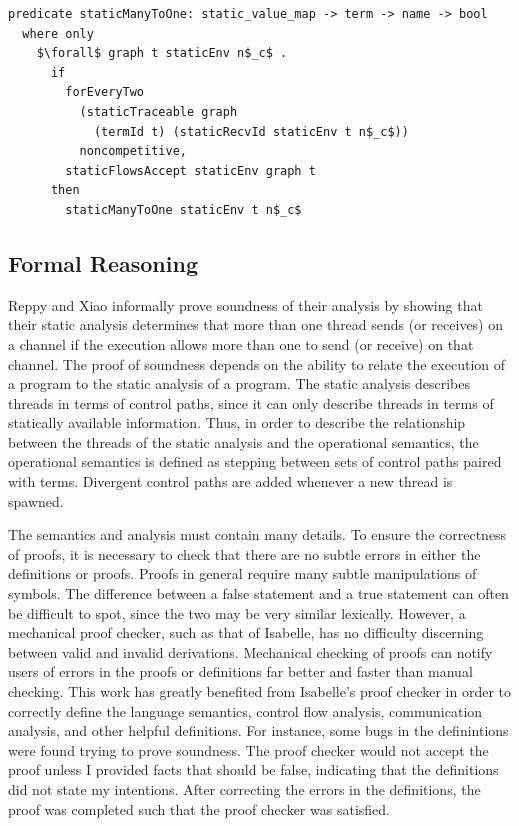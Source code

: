 \documentclass[letterpaper, 11pt]{extarticle}
\begin{document}
\begin{lstlisting}[language=logic, mathescape]
  predicate staticManyToOne: static_value_map -> term -> name -> bool
  where only
    $\forall$ graph t staticEnv n$_c$ .
      if
        forEveryTwo
          (staticTraceable graph
            (termId t) (staticRecvId staticEnv t n$_c$))
          noncompetitive,
        staticFlowsAccept staticEnv graph t 
      then
        staticManyToOne staticEnv t n$_c$
\end{lstlisting}

\subsection{Formal Reasoning}

Reppy and Xiao informally prove soundness of their analysis by showing that their static analysis
determines that more than one thread sends (or receives) on a channel if the execution allows more
than one to send (or receive) on that channel. The proof of soundness depends on the
ability to relate the execution of a program to the static analysis of a program. The static
analysis describes threads in terms of control paths, since it can only describe threads in
terms of statically available information. Thus, in order to describe the relationship between
the threads of the static analysis and the operational semantics, the operational semantics is
defined as stepping between sets of control paths paired with terms. Divergent control paths
are added whenever a new thread is spawned.

The semantics and analysis must contain many details. To ensure the
correctness of proofs, it is necessary to check that there are no subtle errors in either the 
definitions or proofs. Proofs in general require many subtle manipulations of symbols. The
difference between a false statement and a true statement can often be difficult to spot, since
the two may be very similar lexically. However, a mechanical proof checker, such as that of 
Isabelle, has no difficulty discerning between valid and invalid derivations.
Mechanical checking of proofs can notify users of errors in the proofs or definitions far better
and faster than manual checking. This work has greatly benefited from Isabelle's proof checker in
order to correctly define the language semantics, control flow analysis, communication analysis,
and other helpful definitions. For instance, some bugs in the
definintions were found trying to prove
soundness. The proof checker would not accept the proof unless I provided facts that
should be false, indicating that the definitions did not state my intentions.
After correcting the errors in the definitions, the proof was completed such that the proof
checker was satisfied.
\end{document}
